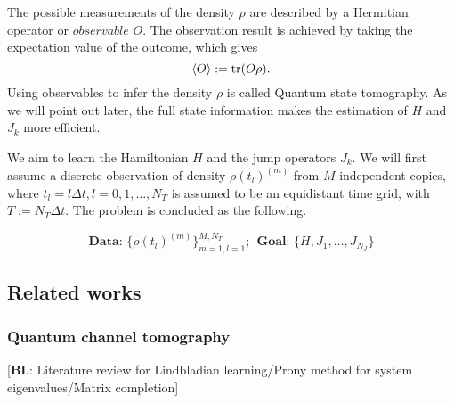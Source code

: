 \documentclass[10pt]{article}  %
\theoremstyle{plain}
\numberwithin{equation}{section}
\newcommand{\bl}[1]{{\color{magenta} [\textbf{BL}: #1]}}
\begin{document}
The possible measurements of the density $\rho$ are described by a Hermitian operator or $observable$ $O$. The observation result is achieved by taking the expectation value of the outcome, which gives 
\begin{equation}
	\expval{O}:= \tr(O\rho).
\end{equation}
Using observables to infer the density $\rho$ is called Quantum state tomography. As we will point out later, the full state information makes the estimation of $H$ and $J_k$ more efficient. 

We aim to learn the Hamiltonian $H$ and the jump operators $J_k$. We will first assume a discrete observation of density $\rho(t_l)^{(m)}$ from $M$ independent copies, where $t_l = l\Delta t, l = 0, 1, \dots, N_T$ is assumed to be an equidistant time grid, with $T:=N_T \Delta t$.  The problem is concluded as the following. 

\begin{equation}
	\textbf{Data: $\{\rho(t_l)^{(m)}\}_{m = 1, l = 1}^{M, N_T}$}; \ \ \textbf{Goal: $\{H, J_1, \dots, J_{N_J}\}$}
\end{equation}



\subsection*{Related works} 
\subsubsection*{Quantum channel tomography}
\bl{Literature review for Lindbladian learning/Prony method for system eigenvalues/Matrix completion}
\end{document}
